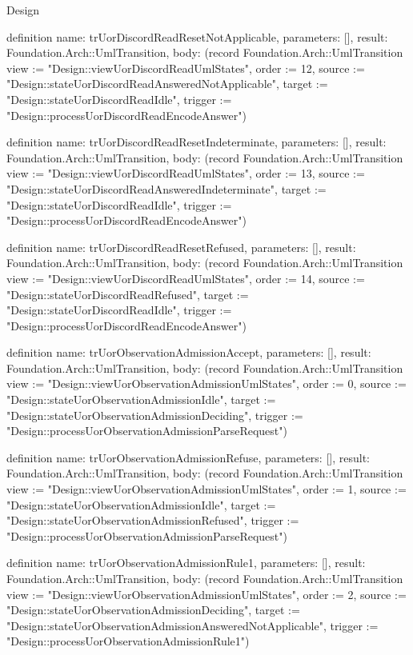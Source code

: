 \begin{lexlean}{Design}
\begin{semanticmodule}
definition{
  name: trUorDiscordReadResetNotApplicable,
  parameters: [],
  result: Foundation.Arch::UmlTransition,
  body: (record Foundation.Arch::UmlTransition {view := "Design::viewUorDiscordReadUmlStates", order := 12, source := "Design::stateUorDiscordReadAnsweredNotApplicable", target := "Design::stateUorDiscordReadIdle", trigger := "Design::processUorDiscordReadEncodeAnswer"})
}

definition{
  name: trUorDiscordReadResetIndeterminate,
  parameters: [],
  result: Foundation.Arch::UmlTransition,
  body: (record Foundation.Arch::UmlTransition {view := "Design::viewUorDiscordReadUmlStates", order := 13, source := "Design::stateUorDiscordReadAnsweredIndeterminate", target := "Design::stateUorDiscordReadIdle", trigger := "Design::processUorDiscordReadEncodeAnswer"})
}

definition{
  name: trUorDiscordReadResetRefused,
  parameters: [],
  result: Foundation.Arch::UmlTransition,
  body: (record Foundation.Arch::UmlTransition {view := "Design::viewUorDiscordReadUmlStates", order := 14, source := "Design::stateUorDiscordReadRefused", target := "Design::stateUorDiscordReadIdle", trigger := "Design::processUorDiscordReadEncodeAnswer"})
}

definition{
  name: trUorObservationAdmissionAccept,
  parameters: [],
  result: Foundation.Arch::UmlTransition,
  body: (record Foundation.Arch::UmlTransition {view := "Design::viewUorObservationAdmissionUmlStates", order := 0, source := "Design::stateUorObservationAdmissionIdle", target := "Design::stateUorObservationAdmissionDeciding", trigger := "Design::processUorObservationAdmissionParseRequest"})
}

definition{
  name: trUorObservationAdmissionRefuse,
  parameters: [],
  result: Foundation.Arch::UmlTransition,
  body: (record Foundation.Arch::UmlTransition {view := "Design::viewUorObservationAdmissionUmlStates", order := 1, source := "Design::stateUorObservationAdmissionIdle", target := "Design::stateUorObservationAdmissionRefused", trigger := "Design::processUorObservationAdmissionParseRequest"})
}

definition{
  name: trUorObservationAdmissionRule1,
  parameters: [],
  result: Foundation.Arch::UmlTransition,
  body: (record Foundation.Arch::UmlTransition {view := "Design::viewUorObservationAdmissionUmlStates", order := 2, source := "Design::stateUorObservationAdmissionDeciding", target := "Design::stateUorObservationAdmissionAnsweredNotApplicable", trigger := "Design::processUorObservationAdmissionRule1"})
}


\end{semanticmodule}
\end{lexlean}
